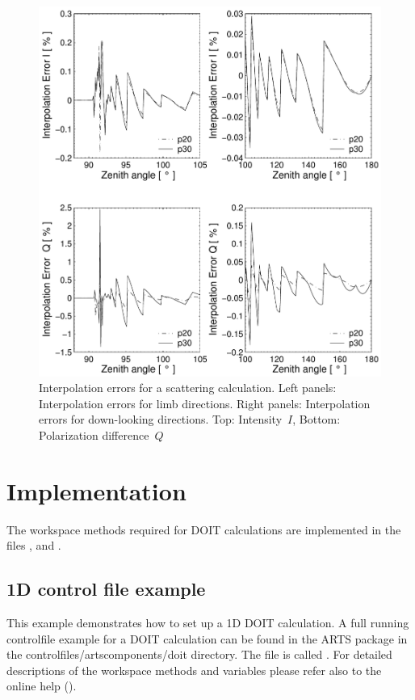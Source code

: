 \begin{figure}[htbp]
  \centering
  \includegraphics[width=.9\hsize]{interp_err}
  \caption{Interpolation errors for a scattering calculation.
    Left panels: Interpolation errors for limb directions.
    Right panels: Interpolation errors for down-looking directions.
    Top: Intensity~$I$, Bottom: Polarization difference~$Q$}
  \label{fig:scattering:interp_err}  
\end{figure}

\section{Implementation}

The workspace methods required for DOIT calculations are implemented
in the files ,  and
. 

\subsection{1D control file example}
This example demonstrates how to set up a 1D DOIT calculation. A full
running controlfile example for a DOIT calculation can be found in the
ARTS package in the controlfiles/artscomponents/doit directory. The file
is called . For detailed descriptions of the
workspace methods and variables please refer also to the online help
().
 
